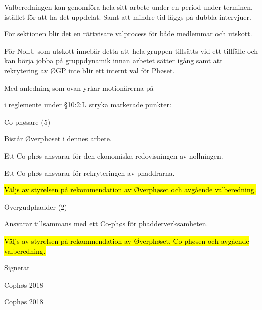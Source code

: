 \documentclass[../_main/handlingar.tex]{subfiles}
\begin{document}
\begin{dashlist}
    \item Valberedningen kan genomföra hela sitt arbete under en period under terminen, istället
    för att ha det uppdelat. Samt att mindre tid läggs på dubbla intervjuer.
    \item För sektionen blir det en rättvisare valprocess för både medlemmar och utskott.
    \item För NollU som utskott innebär detta att hela gruppen tillsätts vid ett tillfälle och kan börja
    jobba på gruppdynamik innan arbetet sätter igång samt att rekrytering av ØGP inte blir
    ett internt val för Phøset.
\end{dashlist}
\newpage
Med anledning som ovan yrkar motionärerna på
\begin{attsatser}
\att i reglemente under \S10:2:L stryka markerade punkter:

\begin{emptylist}
    \item Co-phøsare (5)
        \begin{dashlist}
          \item Bistår Øverphøset i dennes arbete.
          \item Ett Co-phøs ansvarar för den ekonomiska redovisningen av nollningen.
          \item Ett Co-phøs ansvarar för rekryteringen av phaddrarna.
          \item \hl{Väljs av styrelsen på rekommendation av Øverphøset och avgående valberedning.}
        \end{dashlist}
    \item Övergudphadder (2)
        \begin{dashlist}
          \item Ansvarar tillsammans med ett Co-phøs för phadderverksamheten.
          \item \hl{Väljs av styrelsen på rekommendation av Øverphøset, Co-phøsen och avgående
          valberedning.}
        \end{dashlist}
\end{emptylist}
\changenote
\end{attsatser}
\begin{signatures}{2}
    Signerat
    \signature{Edvard Carlsson}{Cophøs 2018}
    \signature{Sonja Kenari}{Cophøs 2018}
\end{signatures}
\end{document}
